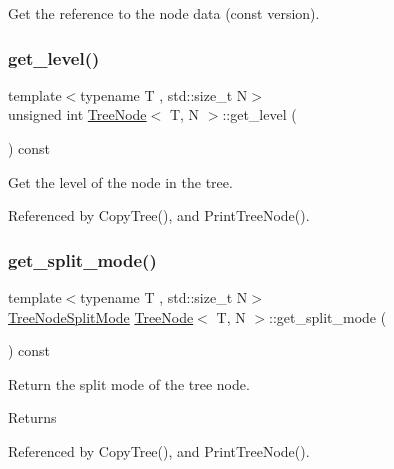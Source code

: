 Get the reference to the node data (const version). \mbox{\label{classTreeNode_acdf29b3bf8f5f9c5e04baaa9fd71fb4c}} 
\subsubsection{\texorpdfstring{get\+\_\+level()}{get\_level()}}
{\footnotesize\ttfamily template$<$typename T , std\+::size\+\_\+t N$>$ \\
unsigned int \hyperlink{classTreeNode}{Tree\+Node}$<$ T, N $>$\+::get\+\_\+level (\begin{DoxyParamCaption}{ }\end{DoxyParamCaption}) const}

Get the level of the node in the tree. 

Referenced by Copy\+Tree(), and Print\+Tree\+Node().

\mbox{\label{classTreeNode_a219944254f78755b181cad0ee621835f}} 
\subsubsection{\texorpdfstring{get\+\_\+split\+\_\+mode()}{get\_split\_mode()}}
{\footnotesize\ttfamily template$<$typename T , std\+::size\+\_\+t N$>$ \\
\hyperlink{tree_8h_a922ca07db9633957939f697a65aff11d}{Tree\+Node\+Split\+Mode} \hyperlink{classTreeNode}{Tree\+Node}$<$ T, N $>$\+::get\+\_\+split\+\_\+mode (\begin{DoxyParamCaption}{ }\end{DoxyParamCaption}) const}

Return the split mode of the tree node. \begin{DoxyReturn}{Returns}

\end{DoxyReturn}


Referenced by Copy\+Tree(), and Print\+Tree\+Node().

\mbox{\label{classTreeNode_a1d471684d9c06b5721217fb55182bdeb}} 
